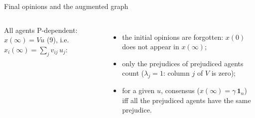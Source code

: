 \documentclass[10pt, aspectratio=169]{beamer}
\begin{document}
\begin{frame}[label=m-fj-final]{Final opinions and the augmented graph}
  \begin{columns}[T]
      \footnotesize
      All agents P-dependent: $x(\infty) = Vu$ (9), i.e.\
      $x_i(\infty) = \sum_{j} v_{ij}\, u_j$:
      \begin{itemize}
        \item the initial opinions are \alert{forgotten}: $x(0)$ does not appear in
              $x(\infty)$;
        \item only the prejudices of prejudiced agents count ($\lambda_j = 1$: column $j$
              of $V$ is zero);
        \item for a given $u$, \alert{consensus} ($x(\infty) = \gamma\,\mathbf{1}_n$) iff
              all the prejudiced agents have the same prejudice.
      \end{itemize}

\end{columns}
\end{frame}
\end{document}
